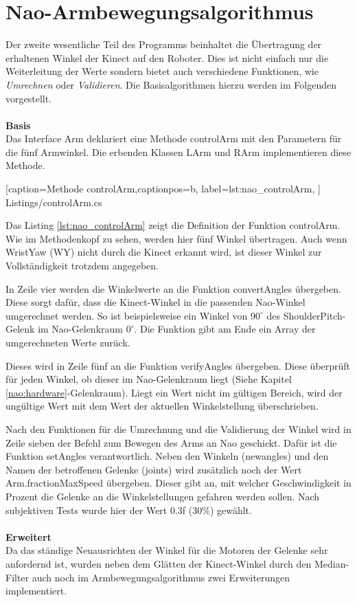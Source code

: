 \section{Nao-Armbewegungsalgorithmus}\label{s:naoAlgo}
Der zweite wesentliche Teil des Programms beinhaltet die Übertragung der erhaltenen Winkel der Kinect auf den Roboter. Dies ist nicht einfach nur die Weiterleitung der Werte sondern bietet auch verschiedene Funktionen, wie \textit{Umrechnen} oder \textit{Validieren}. Die Basisalgorithmen hierzu werden im Folgenden vorgestellt.
\\
\\
\textbf{Basis}
\\
Das Interface \textsf{Arm} deklariert eine Methode \textsf{controlArm} mit den Parametern für die fünf Armwinkel. Die erbenden Klassen \textsf{LArm} und \textsf{RArm} implementieren diese Methode. 


    [caption={Methode \textsf{controlArm}},captionpos=b,
       label=lst:nao_controlArm,
       ]	
 {Listings/controlArm.cs}

Das Listing \ref{lst:nao_controlArm} zeigt die Definition der Funktion \textsf{controlArm}. Wie im Methodenkopf zu sehen, werden hier fünf Winkel übertragen. Auch wenn WristYaw (WY) nicht durch die Kinect erkannt wird, ist dieser Winkel zur Vollständigkeit trotzdem angegeben. 

In Zeile vier werden die Winkelwerte an die Funktion \textsf{convertAngles} übergeben. Diese sorgt dafür, dass die Kinect-Winkel in die passenden Nao-Winkel umgerechnet werden. So ist beispielsweise ein Winkel von $90^\circ$ des ShoulderPitch-Gelenk im Nao-Gelenkraum $0^\circ$. Die Funktion gibt am Ende ein Array der umgerechneten Werte zurück.

Dieses wird in Zeile fünf an die Funktion \textsf{verifyAngles} übergeben. Diese überprüft für jeden Winkel, ob dieser im Nao-Gelenkraum liegt (Siehe Kapitel \ref{nao:hardware}-Gelenkraum). Liegt ein Wert nicht im gültigen Bereich, wird der ungültige Wert mit dem Wert der aktuellen Winkelstellung überschrieben.

Nach den Funktionen für die Umrechnung und die Validierung der Winkel wird in Zeile sieben der Befehl zum Bewegen des Arms an Nao geschickt. Dafür ist die Funktion \textsf{setAngles} verantwortlich. Neben den Winkeln (\textsf{newangles}) und den Namen der betroffenen Gelenke (\textsf{joints}) wird zusätzlich noch der Wert \textsf{Arm.fractionMaxSpeed} übergeben. Dieser gibt an, mit welcher Geschwindigkeit in Prozent die Gelenke an die Winkelstellungen gefahren werden sollen. Nach subjektiven Tests wurde hier der Wert 0.3f (30\%) gewählt. 
\\
\\
\textbf{Erweitert}
\\
Da das ständige Neuausrichten der Winkel für die Motoren der Gelenke sehr anfordernd ist, wurden neben dem Glätten der Kinect-Winkel durch den Median-Filter auch noch im Armbewegungsalgorithmus zwei Erweiterungen implementiert.

